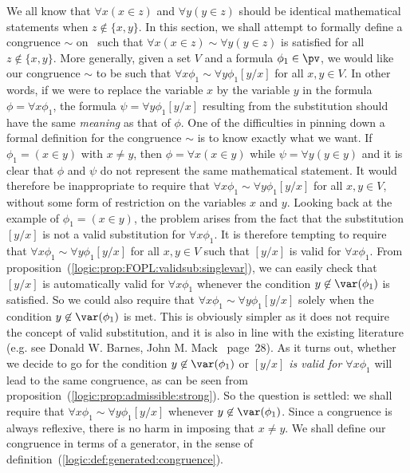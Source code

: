 We all know that $\forall x(x\in z)$ and $\forall y(y\in z)$ should
be identical mathematical statements when $z\not\in\{x,y\}$. In this
section, we shall attempt to formally define a congruence $\sim$ on
\pv\ such that $\forall x(x\in z)\sim\forall y(y\in z)$ is satisfied
for all $z\not\in\{x,y\}$. More generally, given a set $V$ and a
formula $\phi_{1}\in\pv$, we would like our congruence $\sim$ to be
such that $\forall x\phi_{1}\sim\forall y\phi_{1}[y/x]$ for all
$x,y\in V$. In other words, if we were to replace the variable $x$
by the variable $y$ in the formula $\phi=\forall x\phi_{1}$, the
formula $\psi=\forall y\phi_{1}[y/x]$ resulting from the
substitution should have the same {\em meaning} as that of $\phi$.
One of the difficulties in pinning down a formal definition for the
congruence $\sim$ is to know exactly what we want. If
$\phi_{1}=(x\in y)$ with $x\neq y$, then $\phi=\forall x(x\in y)$
while $\psi=\forall y(y\in y)$ and it is clear that $\phi$ and
$\psi$ do not represent the same mathematical statement. It would
therefore be inappropriate to require that $\forall
x\phi_{1}\sim\forall y\phi_{1}[y/x]$ for all $x,y\in V$, without
some form of restriction on the variables $x$ and $y$. Looking back
at the example of $\phi_{1}=(x\in y)$, the problem arises from the
fact that the substitution $[y/x]$ is not a valid substitution for
$\forall x\phi_{1}$. It is therefore tempting to require that
$\forall x\phi_{1}\sim\forall y\phi_{1}[y/x]$ for all $x,y\in V$
such that $[y/x]$ is valid for $\forall x\phi_{1}$. From
proposition~(\ref{logic:prop:FOPL:validsub:singlevar}), we can
easily check that $[y/x]$ is automatically valid for $\forall
x\phi_{1}$ whenever the condition $y\not\in\var(\phi_{1})$ is
satisfied. So we could also require that $\forall
x\phi_{1}\sim\forall y\phi_{1}[y/x]$ solely when the condition
$y\not\in\var(\phi_{1})$ is met. This is obviously simpler as it
does not require the concept of valid substitution, and it is also
in line with the existing literature (e.g. see Donald W. Barnes,
John M. Mack~\cite{AlgLog} page~28). As it turns out, whether we
decide to go for the condition $y\not\in\var(\phi_{1})$ or {\em
$[y/x]$ is valid for $\forall x\phi_{1}$} will lead to the same
congruence, as can be seen from
proposition~(\ref{logic:prop:admissible:strong}). So the question is
settled: we shall require that $\forall x\phi_{1}\sim\forall
y\phi_{1}[y/x]$ whenever $y\not\in\var(\phi_{1})$. Since a
congruence is always reflexive, there is no harm in imposing that
$x\neq y$. We shall define our congruence in terms of a generator,
in the sense of definition~(\ref{logic:def:generated:congruence}).
